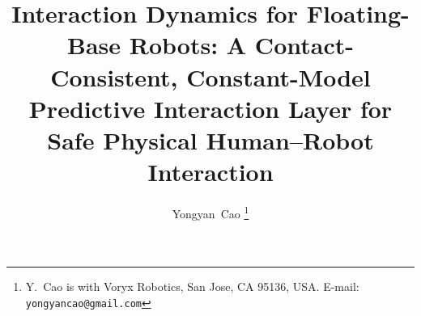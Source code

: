 \documentclass[journal]{IEEEtran}
\begin{document}
\title{Interaction Dynamics for Floating-Base Robots:
       A Contact-Consistent, Constant-Model Predictive
       Interaction Layer for Safe Physical Human--Robot Interaction}

\author{Yongyan~Cao%
  \thanks{Y.~Cao is with Voryx Robotics, San Jose, CA 95136, USA.
          E-mail: \texttt{yongyancao@gmail.com}}}

\maketitle


\end{document}
